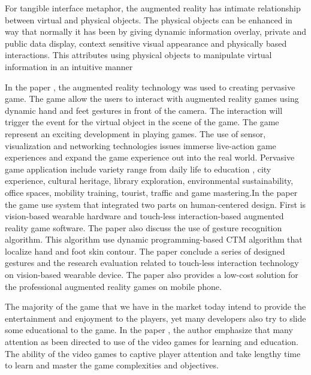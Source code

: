 \documentclass[12pt]{article}
\begin{document}
\newline

\par

For tangible interface metaphor, the augmented reality has intimate relationship between virtual and physical objects. The physical objects can be enhanced in way that normally it has been by giving dynamic information overlay, private and public data display, context sensitive visual appearance and physically based interactions. This attributes using physical objects to manipulate virtual information in an intuitive manner

\par In the paper \cite{lv2015touch}, the augmented reality technology was used to creating pervasive game. The game allow the users to interact with augmented reality games using dynamic hand and feet gestures in front of the camera. The interaction will trigger the event for the virtual object in the scene of the game. The game represent an exciting development in playing games. The use of sensor, visualization and networking technologies issues immerse live-action game experiences and expand the game experience out into the real world. Pervasive game application include variety range from daily life to education , city experience, cultural heritage, library exploration, environmental sustainability, office spaces, mobility training, tourist, traffic and game mastering.In the paper the game use system that integrated two parts on human-centered design. First is vision-based wearable hardware and touch-less interaction-based augmented reality game software. The paper also discuss the use of gesture recognition algorithm. This algorithm use dynamic programming-based CTM algorithm that localize hand and foot skin contour.%
The paper conclude a series of designed gestures and the research evaluation related to touch-less interaction technology on vision-based wearable device. The paper also provides a low-cost solution for the professional augmented reality games on mobile phone.
\par The majority of the game that we have in the market today intend to provide the entertainment and enjoyment to the players, yet many developers also try to slide some educational to the game. In the paper \cite{dondlinger2007educational}, the author emphasize that many attention as been directed to use of the video games for learning and education. The ability of the video games to captive player attention and take lengthy time to learn and master the game complexities and objectives.
\end{document}
